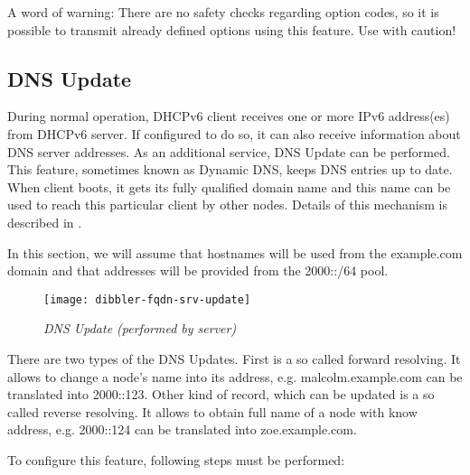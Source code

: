 A word of warning: There are no safety checks regarding option codes,
so it is possible to transmit already defined options using this
feature. Use with caution!

\subsection{DNS Update}
\label{feature-dns-update}
During normal operation, DHCPv6 client receives one or more IPv6
address(es) from DHCPv6 server. If configured to do so, it can also
receive information about DNS server addresses. As an additional
service, DNS Update can be performed. This feature, sometimes known as
Dynamic DNS, keeps DNS entries up to date. When client boots, it gets
its fully qualified domain name and this name can be used to reach
this particular client by other nodes. Details of this mechanism is
described in \cite{rfc4704}.

\Note In this section, we will assume that hostnames will be used from
the example.com domain and that addresses will be provided from the
2000::/64 pool.

\begin{figure}[ht]
\begin{center}
\texttt{[image: dibbler-fqdn-srv-update]}
\caption{\emph{DNS Update (performed by server)}}
\end{center}
\end{figure}

There are two types of the DNS Updates. First is a so called forward
resolving. It allows to change a node's name into its address,
e.g. malcolm.example.com can be translated into 2000::123. Other kind
of record, which can be updated is a so called reverse resolving. It
allows to obtain full name of a node with know address, e.g. 2000::124
can be translated into zoe.example.com.

To configure this feature, following steps must be performed:

